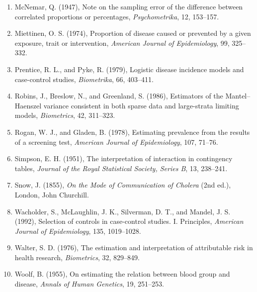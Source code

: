 \documentclass[11pt,a4paper]{article}
\numberwithin{equation}{section}
\theoremstyle{definition}
\begin{document}
\begin{enumerate}
\emph{Journal of the National Cancer Institute}, 22, 719--748.
\item McNemar, Q. (1947), Note on the sampling error of the difference between correlated proportions or percentages,
\emph{Psychometrika}, 12, 153--157.
\item Miettinen, O. S. (1974), Proportion of disease caused or prevented by a given exposure, trait or intervention, \emph{American
Journal of Epidemiology}, 99, 325--332.
\item Prentice, R. L., and Pyke, R. (1979), Logistic disease incidence models and case-control studies, \emph{Biometrika}, 66, 403--411.
\item Robins, J., Breslow, N., and Greenland, S. (1986), Estimators of the Mantel--Haenszel variance consistent in both sparse data and
large-strata limiting models, \emph{Biometrics}, 42, 311--323.
\item Rogan, W. J., and Gladen, B. (1978), Estimating prevalence from the results of a screening test, \emph{American Journal of
Epidemiology}, 107, 71--76.
\item Simpson, E. H. (1951), The interpretation of interaction in contingency tables, \emph{Journal of the Royal Statistical Society,
Series B}, 13, 238--241.
\item Snow, J. (1855), \emph{On the Mode of Communication of Cholera} (2nd ed.), London, John Churchill.
\item Wacholder, S., McLaughlin, J. K., Silverman, D. T., and Mandel, J. S. (1992), Selection of controls in case-control studies. I.
Principles, \emph{American Journal of Epidemiology}, 135, 1019--1028.
\item Walter, S. D. (1976), The estimation and interpretation of attributable risk in health research, \emph{Biometrics}, 32, 829--849.
\item Woolf, B. (1955), On estimating the relation between blood group and disease, \emph{Annals of Human Genetics}, 19, 251--253.
\end{enumerate}
\end{document}
